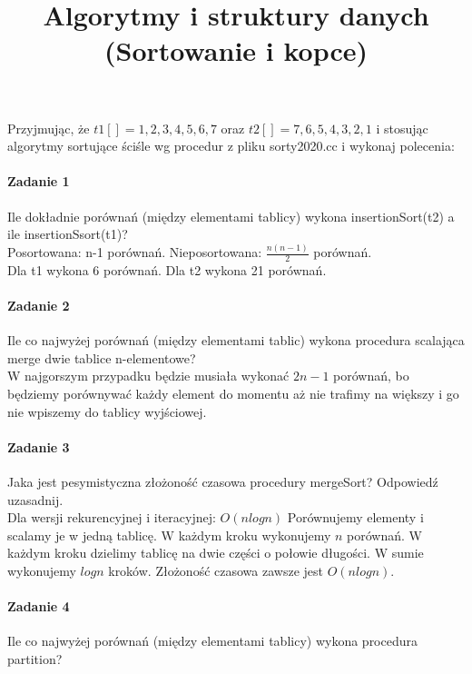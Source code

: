 \documentclass[18pt]{extarticle}
\begin{document}
\large
{}\selectfont

\title{Algorytmy i struktury danych (Sortowanie i kopce)}
\date{}
\maketitle

Przyjmując, że $t1[]={1,2,3,4,5,6,7}$ oraz $t2[]={7,6,5,4,3,2,1}$ i stosując algorytmy sortujące ściśle wg procedur z pliku sorty2020.cc i wykonaj polecenia:

\paragraph{Zadanie 1} Ile dokładnie porównań (między elementami  tablicy) wykona insertionSort(t2) a ile insertionSsort(t1)? \\

Posortowana: n-1 porównań. Nieposortowana: $\frac{n(n-1)}{2}$ porównań. \\
Dla t1 wykona 6 porównań. Dla t2 wykona 21 porównań.

\paragraph{Zadanie 2} Ile co najwyżej porównań (między elementami tablic) wykona procedura scalająca merge dwie tablice n-elementowe? \\


W najgorszym przypadku będzie musiała wykonać $2n - 1$ porównań, bo będziemy porównywać każdy element do momentu aż nie trafimy na większy i go nie wpiszemy do tablicy wyjściowej.

\paragraph{Zadanie 3} Jaka jest pesymistyczna złożoność czasowa procedury mergeSort? Odpowiedź uzasadnij. \\


Dla wersji rekurencyjnej i iteracyjnej: $O(nlogn)$ 
Porównujemy elementy i scalamy je w jedną tablicę. W każdym kroku wykonujemy $n$ porównań. W każdym kroku dzielimy tablicę na dwie części o połowie długości. W sumie wykonujemy $logn$ kroków. Złożoność czasowa zawsze jest $O(nlogn)$.

\paragraph{Zadanie 4} Ile co najwyżej porównań (między elementami tablicy) wykona procedura partition? \\
\end{document}

